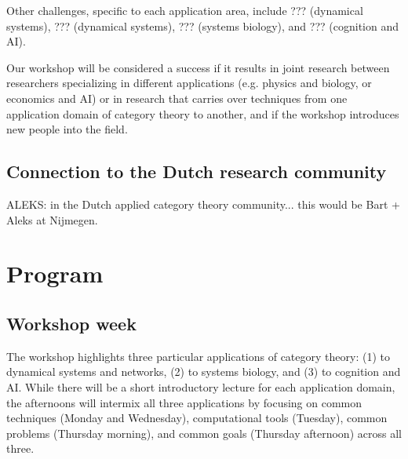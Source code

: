 \documentclass{article}
\newcommand{\redout}[1]{{\color{red}#1}}
\begin{document}
Other challenges, specific to each application area, include \redout{???} (dynamical systems), \redout{???} (dynamical systems), \redout{???} (systems biology), and \redout{???} (cognition and AI).

Our workshop will be considered a success if it results in joint research between researchers specializing in different applications (e.g. physics and biology, or economics and AI) or in research that carries over techniques from one application domain of category theory to another, and if the workshop introduces new people into the field.

\subsection{Connection to the Dutch research community}
\redout{ALEKS: in the Dutch applied category theory community... this would be Bart + Aleks at Nijmegen.}

\section{Program}
\subsection{Workshop week}
The workshop highlights three particular applications of category theory: (1) to dynamical systems and networks, (2) to systems biology, and (3) to cognition and AI. While there will be a short introductory lecture for each application domain, the afternoons will intermix all three applications by focusing on common techniques (Monday and Wednesday), computational tools (Tuesday), common problems (Thursday morning), and common goals (Thursday afternoon) across all three.
\end{document}

